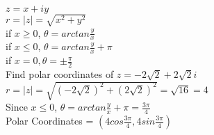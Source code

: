 \documentclass{article}
\begin{document}
            $z = x+iy$ \\
            $r = \lvert z \rvert = \sqrt{x^2 + y^2}$ \\
            if $x \geq 0$, $\theta = arctan \frac{y}{x}$ \\
            if $x \leq 0$, $\theta = arctan \frac{y}{x} + \pi$ \\
            if $x = 0, \theta = \pm \frac{\pi}{2}$ \\ 
            Find polar coordinates of $z = -2\sqrt{2} + 2\sqrt{2}i$\\
            $r = \lvert z \rvert = \sqrt{(-2\sqrt{2})^2  + (2\sqrt{2})^2} = \sqrt{16} = 4$ \\
            Since $x \leq 0$, $\theta =  arctan \frac{y}{x} + \pi = \frac{3\pi}{4} $ \\
            Polar Coordinates = $(4cos\frac{3\pi}{4},4sin\frac{3\pi}{4})$
\end{document}
